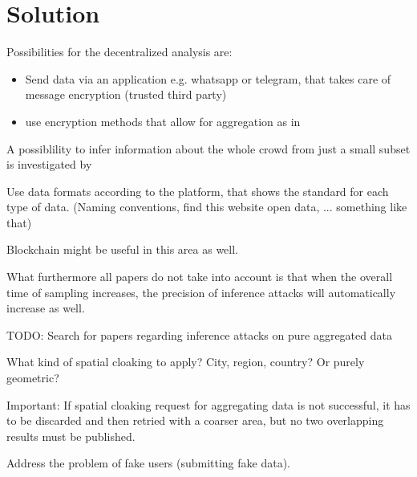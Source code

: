 \chapter{Solution}\label{chapter:solution}

Possibilities for the decentralized analysis are:
\begin{itemize}
	\item Send data via an application e.g. whatsapp or telegram, that takes care of message encryption (trusted third party)
	\item use encryption methods that allow for aggregation as in \parencite{crowdsourcing}
\end{itemize}

A possiblility to infer information about the whole crowd from just a small subset is investigated by \parencite{subset}

Use data formats according to the platform, that shows the standard for each type of data. (Naming conventions, find this website open data, ... something like that)

Blockchain might be useful in this area as well.

What furthermore all papers do not take into account is that when the overall time of sampling increases, the precision of inference attacks will automatically increase as well. 

TODO: Search for papers regarding inference attacks on pure aggregated data

What kind of spatial cloaking to apply? City, region, country? Or purely geometric?

Important: If spatial cloaking request for aggregating data is not successful, it has to be discarded and then retried with a coarser area, but no two overlapping results must be published.

Address the problem of fake users (submitting fake data).

